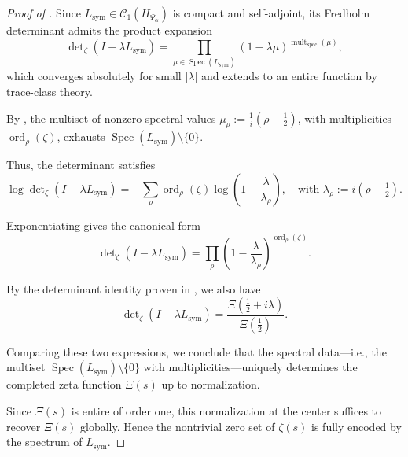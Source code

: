 \begin{proof}[Proof of ]
Since \( L_{\mathrm{sym}} \in \mathcal{C}_1(H_{\Psi_\alpha}) \) is compact and self-adjoint, its Fredholm determinant admits the product expansion
\[
\det\nolimits_\zeta(I - \lambda L_{\mathrm{sym}}) = \prod_{\mu \in \operatorname{Spec}(L_{\mathrm{sym}})} (1 - \lambda \mu)^{\operatorname{mult}_{\mathrm{spec}}(\mu)},
\]
which converges absolutely for small \( |\lambda| \) and extends to an entire function by trace-class theory.

By , the multiset of nonzero spectral values \( \mu_\rho := \frac{1}{i}(\rho - \tfrac{1}{2}) \), with multiplicities \( \operatorname{ord}_\rho(\zeta) \), exhausts \( \operatorname{Spec}(L_{\mathrm{sym}}) \setminus \{0\} \).

Thus, the determinant satisfies
\[
\log \det\nolimits_\zeta(I - \lambda L_{\mathrm{sym}})
= - \sum_{\rho} \operatorname{ord}_\rho(\zeta) \log\left(1 - \frac{\lambda}{\lambda_\rho} \right), \quad \text{with } \lambda_\rho := i(\rho - \tfrac{1}{2}).
\]

Exponentiating gives the canonical form
\[
\det\nolimits_\zeta(I - \lambda L_{\mathrm{sym}})
= \prod_{\rho} \left(1 - \frac{\lambda}{\lambda_\rho} \right)^{\operatorname{ord}_\rho(\zeta)}.
\]

By the determinant identity proven in , we also have
\[
\det\nolimits_\zeta(I - \lambda L_{\mathrm{sym}}) = \frac{\Xi(\tfrac{1}{2} + i\lambda)}{\Xi(\tfrac{1}{2})}.
\]

Comparing these two expressions, we conclude that the spectral data—i.e., the multiset \( \operatorname{Spec}(L_{\mathrm{sym}}) \setminus \{0\} \) with multiplicities—uniquely determines the completed zeta function \( \Xi(s) \) up to normalization.

Since \( \Xi(s) \) is entire of order one, this normalization at the center suffices to recover \( \Xi(s) \) globally. Hence the nontrivial zero set of \( \zeta(s) \) is fully encoded by the spectrum of \( L_{\mathrm{sym}} \).
\end{proof}

